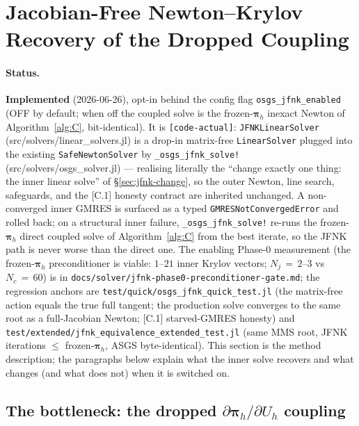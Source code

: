 \documentclass{article}
\newcommand{\code}[1]{\texttt{\small #1}}
\begin{document}
\section{Jacobian-Free Newton--Krylov Recovery of the Dropped Coupling}
\label{sec:jfnk}

\paragraph{Status.}  \textbf{Implemented} (2026-06-26), opt-in behind the
config flag \code{osgs\_jfnk\_enabled} (OFF by default; when off the coupled
solve is the frozen-$\boldsymbol{\pi}_h$ inexact Newton of
Algorithm~\ref{alg:C}, bit-identical). It is \code{[code-actual]}:
\code{JFNKLinearSolver} (src/solvers/linear\_solvers.jl) is a drop-in
matrix-free \code{LinearSolver} plugged into the existing
\code{SafeNewtonSolver} by \code{\_osgs\_jfnk\_solve!}
(src/solvers/osgs\_solver.jl) --- realising literally the ``change exactly one
thing: the inner linear solve'' of §\ref{sec:jfnk-change}, so the outer Newton,
line search, safeguards, and the [C.1] honesty contract are inherited
unchanged. A non-converged inner GMRES is surfaced as a typed
\code{GMRESNotConvergedError} and rolled back; on a structural inner
failure, \code{\_osgs\_jfnk\_solve!} re-runs the frozen-$\boldsymbol{\pi}_h$
direct coupled solve of Algorithm~\ref{alg:C} from the best iterate, so the
JFNK path is never worse than the direct one. The enabling Phase-0 measurement (the frozen-$\boldsymbol{\pi}_h$
preconditioner is viable: $1$--$21$ inner Krylov vectors; $N_j\,{=}\,2$--$3$
vs $N_c\,{=}\,60$) is in \code{docs/solver/jfnk-phase0-preconditioner-gate.md};
the regression anchors are \code{test/quick/osgs\_jfnk\_quick\_test.jl} (the
matrix-free action equals the true full tangent; the production solve converges
to the same root as a full-Jacobian Newton; [C.1] starved-GMRES honesty) and
\code{test/extended/jfnk\_equivalence\_extended\_test.jl} (same MMS root,
JFNK iterations $\le$ frozen-$\boldsymbol{\pi}_h$, ASGS byte-identical). This
section is the method description; the paragraphs below explain what the inner
solve recovers and what changes (and what does not) when it is switched on.

\subsection{The bottleneck: the dropped \texorpdfstring{$\partial\boldsymbol{\pi}_h/\partial U_h$}{dpi/dU} coupling}
\label{sec:jfnk-bottleneck}
\end{document}
